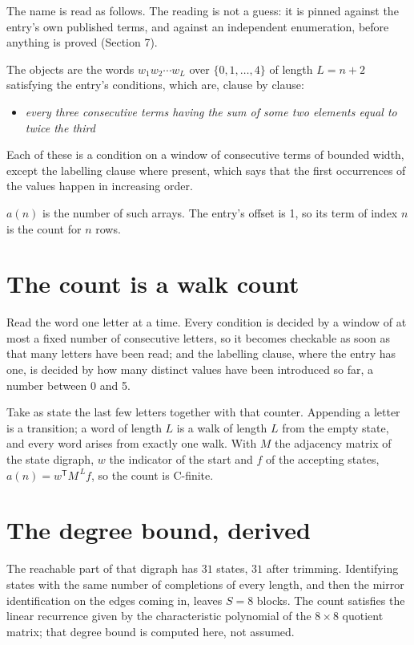 \documentclass[11pt]{article}
\theoremstyle{definition}
\begin{document}
The name is read as follows. The reading is not a guess: it is pinned against the entry's own published terms, and against an independent enumeration, before anything is proved (Section 7).

The objects are the words $w_1 w_2 \cdots w_L$ over $\{0,1,\dots,4\}$ of length $L = n + 2$ satisfying the entry's conditions, which are, clause by clause:

\begin{itemize}

\item {\itshape every three consecutive terms having the sum of some two elements equal to twice the third}

\end{itemize}

Each of these is a condition on a window of consecutive terms of bounded width, except the labelling clause where present, which says that the first occurrences of the values happen in increasing order.

$a(n)$ is the number of such arrays. The entry's offset is 1, so its term of index $n$ is the count for $n$ rows.

\section{The count is a walk count}

Read the word one letter at a time. Every condition is decided by a window of at most a fixed number of consecutive letters, so it becomes checkable as soon as that many letters have been read; and the labelling clause, where the entry has one, is decided by how many distinct values have been introduced so far, a number between $0$ and 5.

Take as state the last few letters together with that counter. Appending a letter is a transition; a word of length $L$ is a walk of length $L$ from the empty state, and every word arises from exactly one walk. With $M$ the adjacency matrix of the state digraph, $w$ the indicator of the start and $f$ of the accepting states, $a(n) = w^{\mathsf T}M^{\,L}f$, so the count is C-finite.

\section{The degree bound, derived}

The reachable part of that digraph has $31$ states, $31$ after trimming. Identifying states with the same number of completions of every length, and then the mirror identification on the edges coming in, leaves $S = 8$ blocks. The count satisfies the linear recurrence given by the characteristic polynomial of the $8\times8$ quotient matrix; that degree bound is computed here, not assumed.
\end{document}
